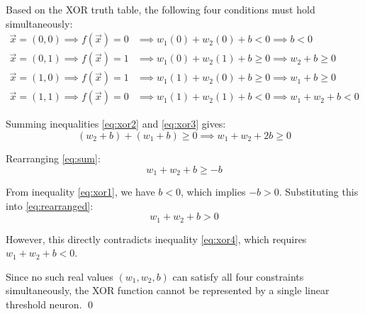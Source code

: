 \documentclass[11pt,english]{article}
\begin{document}
\begin{enumerate}
Based on the XOR truth table, the following four conditions must hold simultaneously:
\begin{align}
    \vec{x} = (0, 0) \implies f(\vec{x}) = 0 &\implies w_1(0) + w_2(0) + b < 0 \implies b < 0 \label{eq:xor1} \\
    \vec{x} = (0, 1) \implies f(\vec{x}) = 1 &\implies w_1(0) + w_2(1) + b \ge 0 \implies w_2 + b \ge 0 \label{eq:xor2} \\
    \vec{x} = (1, 0) \implies f(\vec{x}) = 1 &\implies w_1(1) + w_2(0) + b \ge 0 \implies w_1 + b \ge 0 \label{eq:xor3} \\
    \vec{x} = (1, 1) \implies f(\vec{x}) = 0 &\implies w_1(1) + w_2(1) + b < 0 \implies w_1 + w_2 + b < 0 \label{eq:xor4}
\end{align}

Summing inequalities \eqref{eq:xor2} and \eqref{eq:xor3} gives:
\begin{equation}
    (w_2 + b) + (w_1 + b) \ge 0 \implies w_1 + w_2 + 2b \ge 0 \label{eq:sum}
\end{equation}

Rearranging \eqref{eq:sum}:
\begin{equation}
    w_1 + w_2 + b \ge -b \label{eq:rearranged}
\end{equation}

From inequality \eqref{eq:xor1}, we have $b < 0$, which implies $-b > 0$. Substituting this into \eqref{eq:rearranged}:
\begin{equation}
    w_1 + w_2 + b > 0
\end{equation}

However, this directly contradicts inequality \eqref{eq:xor4}, which requires $w_1 + w_2 + b < 0$. 

Since no such real values $(w_1, w_2, b)$ can satisfy all four constraints simultaneously, the XOR function cannot be represented by a single linear threshold neuron. \qed

\end{enumerate}


\newpage
\end{document}
